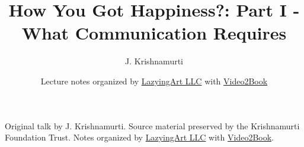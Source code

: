 \documentclass[11pt,oneside]{book}
\begin{document}
\frontmatter
\title{How You Got Happiness?: Part I - What Communication Requires}
\author{J. Krishnamurti}
\date{Lecture notes organized by \href{https://lazying.art}{LazyingArt LLC} with \href{https://github.com/lachlanchen/Video2Book}{Video2Book}}
\maketitle
\begin{center}
\small Original talk by J. Krishnamurti. Source material preserved by the Krishnamurti Foundation Trust. Notes organized by \href{https://lazying.art}{LazyingArt LLC} with \href{https://github.com/lachlanchen/Video2Book}{Video2Book}.
\end{center}
\clearpage
\mainmatter

\end{document}
